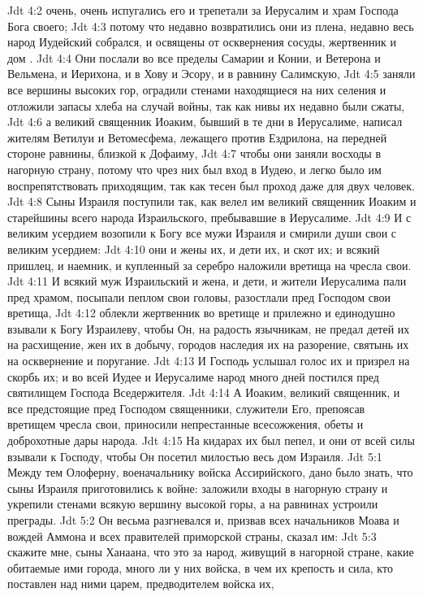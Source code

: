 \vs Jdt 4:2 очень, очень испугались его и трепетали за Иерусалим и храм Господа Бога своего;
\vs Jdt 4:3 потому что недавно возвратились они из плена, недавно весь народ Иудейский собрался, и освящены от осквернения сосуды, жертвенник и дом .
\vs Jdt 4:4 Они послали во все пределы Самарии и Конии, и Ветерона и Вельмена, и Иерихона, и в Хову и Эсору, и в равнину Салимскую,
\vs Jdt 4:5 заняли все вершины высоких гор, оградили стенами находящиеся на них селения и отложили запасы хлеба на случай войны, так как нивы их недавно были сжаты,
\vs Jdt 4:6 а великий священник Иоаким, бывший в те дни в Иерусалиме, написал жителям Ветилуи и Ветомесфема, лежащего против Ездрилона, на передней стороне равнины, близкой к Дофаиму,
\vs Jdt 4:7 чтобы они заняли восходы в нагорную страну, потому что чрез них был вход в Иудею, и легко было им воспрепятствовать приходящим, так как тесен был проход даже для двух человек.
\rsbpar\vs Jdt 4:8 Сыны Израиля поступили так, как велел им великий священник Иоаким и старейшины всего народа Израильского, пребывавшие в Иерусалиме.
\vs Jdt 4:9 И с великим усердием возопили к Богу все мужи Израиля и смирили души свои с великим усердием:
\vs Jdt 4:10 они и жены их, и дети их, и скот их; и всякий пришлец, и наемник, и купленный за серебро наложили вретища на чресла свои.
\vs Jdt 4:11 И всякий муж Израильский и  жена, и дети, и жители Иерусалима пали пред храмом, посыпали пеплом свои головы, разостлали пред Господом свои вретища,
\vs Jdt 4:12 облекли жертвенник во вретище и прилежно и единодушно взывали к Богу Израилеву, чтобы Он, на радость язычникам, не предал детей их на расхищение, жен их в добычу, городов наследия их на разорение, святынь их на осквернение и поругание.
\vs Jdt 4:13 И Господь услышал голос их и призрел на скорбь их; и во всей Иудее и Иерусалиме народ много дней постился пред святилищем Господа Вседержителя.
\vs Jdt 4:14 А Иоаким, великий священник, и все предстоящие пред Господом священники, служители Его, препоясав вретищем чресла свои, приносили непрестанные всесожжения, обеты и доброхотные дары народа.
\vs Jdt 4:15 На кидарах их был пепел, и они от всей силы взывали к Господу, чтобы Он посетил милостью весь дом Израиля.
\vs Jdt 5:1 Между тем Олоферну, военачальнику войска Ассирийского, дано было знать, что сыны Израиля приготовились к войне: заложили входы в нагорную страну и укрепили стенами всякую вершину высокой горы, а на равнинах устроили преграды.
\vs Jdt 5:2 Он весьма разгневался и, призвав всех начальников Моава и вождей Аммона и всех правителей приморской страны, сказал им:
\vs Jdt 5:3 скажите мне, сыны Ханаана, что это за народ, живущий в нагорной стране, какие обитаемые ими города, много ли у них войска, в чем их крепость и сила, кто поставлен над ними царем, предводителем войска их,
